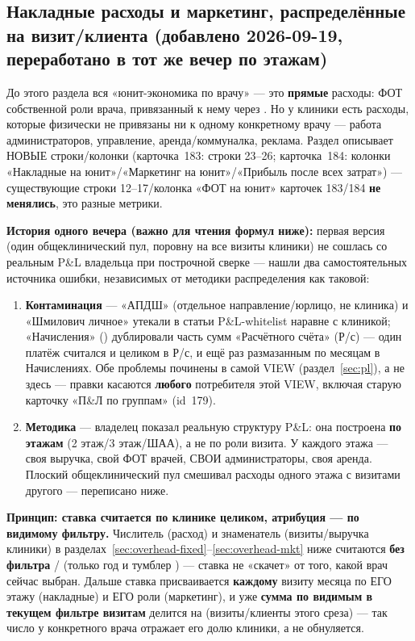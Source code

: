 \documentclass[11pt,a4paper]{article}
\begin{document}
\subsection{Накладные расходы и маркетинг, распределённые на визит/клиента (добавлено 2026-09-19, переработано в тот же вечер по этажам)}
\label{sec:overhead}

До этого раздела вся «юнит-экономика по врачу» — это \textbf{прямые}
расходы: ФОТ собственной роли врача, привязанный к нему через
\texttt{}. Но у клиники есть расходы, которые физически
не привязаны ни к одному конкретному врачу — работа администраторов,
управление, аренда/коммуналка, реклама. Раздел описывает НОВЫЕ
строки/колонки (карточка~183: строки 23--26; карточка~184: колонки
«Накладные на юнит»/«Маркетинг на юнит»/«Прибыль после всех затрат») —
существующие строки 12--17/колонка «ФОТ на юнит» карточек 183/184
\textbf{не менялись}, это разные метрики.

\textbf{История одного вечера (важно для чтения формул ниже):} первая
версия (один общеклинический пул, поровну на все визиты клиники) не
сошлась со реальным P\&L владельца при построчной сверке — нашли два
самостоятельных источника ошибки, независимых от методики распределения
как таковой:
\begin{enumerate}[leftmargin=*]
\item \textbf{Контаминация} — «АПДШ» (отдельное направление/юрлицо, не
  клиника) и «Шмилович личное» утекали в статьи P\&L-whitelist наравне с
  клиникой; «Начисления» (\texttt{}) дублировали часть сумм
  «Расчётного счёта» (Р/с) — один платёж считался и целиком в Р/с, и ещё
  раз размазанным по месяцам в Начислениях. Обе проблемы починены в
  самой VIEW \texttt{} (раздел~\ref{sec:pl}), а не
  здесь — правки касаются \textbf{любого} потребителя этой VIEW, включая
  старую карточку «П\&Л по группам» (id~179).
\item \textbf{Методика} — владелец показал реальную структуру P\&L: она
  построена \textbf{по этажам} (2 этаж/3 этаж/ШАА), а не по роли
  визита. У каждого этажа — своя выручка, свой ФОТ врачей, СВОИ
  администраторы, своя аренда. Плоский общеклинический пул смешивал
  расходы одного этажа с визитами другого — переписано ниже.
\end{enumerate}

\textbf{Принцип: ставка считается по клинике целиком, атрибуция — по
видимому фильтру.} Числитель (расход) и знаменатель (визиты/выручка
клиники) в разделах~\ref{sec:overhead-fixed}--\ref{sec:overhead-mkt}
ниже считаются \textbf{без фильтра} \texttt{}/\allowbreak
\texttt{} (только год и тумблер \texttt{}) — ставка не
«скачет» от того, какой врач сейчас выбран. Дальше ставка присваивается
\textbf{каждому} визиту месяца по ЕГО этажу (накладные) и ЕГО роли
(маркетинг), и уже \textbf{сумма по видимым в текущем фильтре визитам}
делится на \texttt{} (визиты/клиенты этого среза) — так число у
конкретного врача отражает его долю клиники, а не обнуляется.
\end{document}
